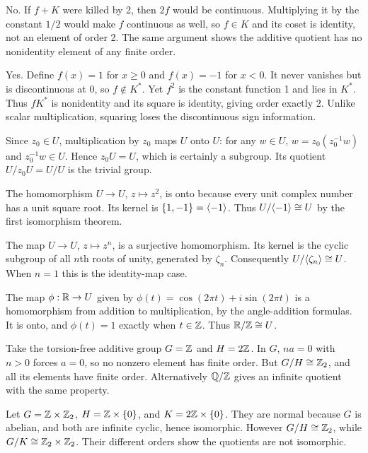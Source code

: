 No. If $f+K$ were killed by 2, then $2f$ would be continuous. Multiplying it by the constant $1/2$ would make $f$ continuous as well, so $f\in K$ and its coset is identity, not an element of order 2. The same argument shows the additive quotient has no nonidentity element of any finite order.

Yes. Define $f(x)=1$ for $x\ge0$ and $f(x)=-1$ for $x<0$. It never vanishes but is discontinuous at 0, so $f\notin K^*$. Yet $f^2$ is the constant function 1 and lies in $K^*$. Thus $fK^*$ is nonidentity and its square is identity, giving order exactly 2. Unlike scalar multiplication, squaring loses the discontinuous sign information.

Since $z_0\in U$, multiplication by $z_0$ maps $U$ onto $U$: for any $w\in U$, $w=z_0(z_0^{-1}w)$ and $z_0^{-1}w\in U$. Hence $z_0U=U$, which is certainly a subgroup. Its quotient $U/z_0U=U/U$ is the trivial group.

The homomorphism $U\to U$, $z\mapsto z^2$, is onto because every unit complex number has a unit square root. Its kernel is $\{1,-1\}=\langle -1\rangle$. Thus $U/\langle -1\rangle\cong U$ by the first isomorphism theorem.

The map $U\to U$, $z\mapsto z^n$, is a surjective homomorphism. Its kernel is the cyclic subgroup of all $n$th roots of unity, generated by $\zeta_n$. Consequently $U/\langle \zeta_n\rangle\cong U$. When $n=1$ this is the identity-map case.

The map $\phi:\mathbb{R}\to U$ given by $\phi(t)=\cos(2\pi t)+i\sin(2\pi t)$ is a homomorphism from addition to multiplication, by the angle-addition formulas. It is onto, and $\phi(t)=1$ exactly when $t\in\mathbb{Z}$. Thus $\mathbb{R}/\mathbb{Z}\cong U$.

Take the torsion-free additive group $G=\mathbb{Z}$ and $H=2\mathbb{Z}$. In $G$, $na=0$ with $n>0$ forces $a=0$, so no nonzero element has finite order. But $G/H\cong\mathbb{Z}_2$, and all its elements have finite order. Alternatively $\mathbb{Q}/\mathbb{Z}$ gives an infinite quotient with the same property.

Let $G=\mathbb{Z}\times\mathbb{Z}_2$, $H=\mathbb{Z}\times\{0\}$, and $K=2\mathbb{Z}\times\{0\}$. They are normal because $G$ is abelian, and both are infinite cyclic, hence isomorphic. However $G/H\cong\mathbb{Z}_2$, while $G/K\cong\mathbb{Z}_2\times\mathbb{Z}_2$. Their different orders show the quotients are not isomorphic.

